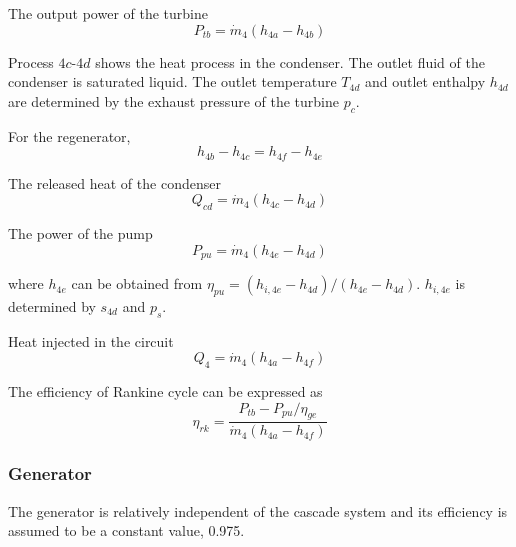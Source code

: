 The output power of the turbine
\begin{equation}
  P_{tb}=\dot{m}_{4}(h_{4a}-h_{4b})
\end{equation}

Process $4c$-$4d$ shows the heat process in the condenser. The outlet fluid of the condenser is saturated liquid. The outlet temperature $T_{4d}$ and outlet enthalpy $h_{4d}$ are determined by the exhaust pressure of the turbine $p_c$.

For the regenerator,
\begin{equation}
  h_{4b} - h_{4c} = h_{4f} - h_{4e}
\end{equation}

The released heat of the condenser
\begin{equation}
  Q_{cd} = \dot{m}_4 (h_{4c} - h_{4d})
\end{equation}

The power of the pump
\begin{equation}
P_{pu}=\dot{m}_{4}(h_{4e}-h_{4d})
\end{equation}
    
where $h_{4e}$ can be obtained from $\eta_{pu} = (h_{i,4e}-h_{4d})/(h_{4e}-h_{4d})$. $h_{i,4e}$ is determined by $s_{4d}$ and $p_s$.
    
Heat injected in the circuit
\begin{equation}
    Q_4=\dot{m}_4(h_{4a}-h_{4f})
\end{equation}

The efficiency of Rankine cycle can be expressed as
\begin{equation}
	\eta_{rk}=\dfrac{P_{tb}-P_{pu}/\eta_{ge}}{\dot{m}_4(h_{4a}-h_{4f})}
\end{equation}




\subsubsection{Generator}
The generator is relatively independent of the cascade system and its efficiency is assumed to be a constant value, 0.975.

